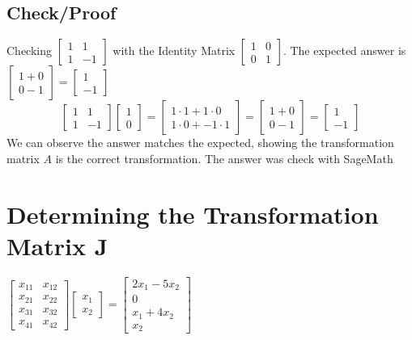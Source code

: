 \documentclass{article}
\begin{document}
\subsection{Check/Proof}
Checking $\begin{bmatrix}1&1\\1&-1\end{bmatrix}$ with the Identity Matrix $\begin{bmatrix}1&0\\0&1\end{bmatrix}$. 
The expected answer is $\begin{bmatrix}1+0\\0-1\end{bmatrix} = \begin{bmatrix}1\\-1\end{bmatrix}$
\\[0.2in]$$\begin{bmatrix}1&1\\1&-1\end{bmatrix}\begin{bmatrix}1\\0\end{bmatrix}= \begin{bmatrix}
1\cdot 1 + 1 \cdot 0 \\ 1\cdot 0+-1\cdot 1\end{bmatrix}=\begin{bmatrix}1+0\\0-1\end{bmatrix}=\begin{bmatrix}1\\-1\end{bmatrix}$$
We can observe the answer matches the expected, showing the transformation matrix $A$ is the correct transformation. The answer was check with SageMath
\section{Determining the Transformation Matrix J}
$\begin{bmatrix}
x_{11}&x_{12}\\x_{21}&x_{22}\\x_{31}&x_{32}\\x_{41}&x_{42}
\end{bmatrix}\begin{bmatrix}x_1\\x_2\end{bmatrix}=\begin{bmatrix}
    2x_1 - 5x_2\\0\\x_1+4x_2\\x_2
\end{bmatrix}$
\end{document}
